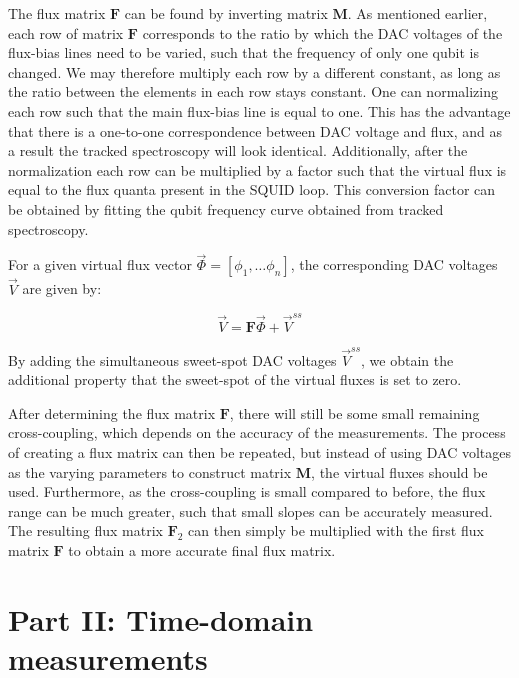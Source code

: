 \documentclass[12pt]{report}
\begin{document}
        The flux matrix $\boldsymbol{F}$ can be found by inverting matrix $\boldsymbol{M}$. As mentioned earlier, each row of matrix $\boldsymbol{F}$ corresponds to the ratio by which the DAC voltages of the flux-bias lines need to be varied, such that the frequency of only one qubit is changed. We may therefore multiply each row by a different constant, as long as the ratio between the elements in each row stays constant. One can normalizing each row such that the main flux-bias line is equal to one. This has the advantage that there is a one-to-one correspondence between DAC voltage and flux, and as a result the tracked spectroscopy will look identical. Additionally, after the normalization each row can be multiplied by a factor such that the virtual flux is equal to the flux quanta present in the SQUID loop. This conversion factor can be obtained by fitting the qubit frequency curve obtained from tracked spectroscopy.

        For a given virtual flux vector $\vec{\Phi}=\left[ \phi_1, \dots \phi_n \right]$, the corresponding DAC voltages $\vec{V}$ are given by:

        \begin{equation}
          \vec{V} = \boldsymbol{F} \vec{\Phi} + \vec{V}^{ss}
        \end{equation}

        By adding the simultaneous sweet-spot DAC voltages $\vec{V}^{ss}$, we obtain the additional property that the sweet-spot of the virtual fluxes is set to zero.

        After determining the flux matrix $\boldsymbol{F}$, there will still be some small remaining cross-coupling, which depends on the accuracy of the measurements. The process of creating a flux matrix can then be repeated, but instead of using DAC voltages as the varying parameters to construct matrix $\boldsymbol{M}$, the virtual fluxes should be used. Furthermore, as the cross-coupling is small compared to before, the flux range can be much greater, such that small slopes can be accurately measured. The resulting flux matrix $\boldsymbol{F}_2$ can then simply be multiplied with the first flux matrix $\boldsymbol{F}$ to obtain a more accurate final flux matrix.






    \section{Part II: Time-domain measurements}
\end{document}
